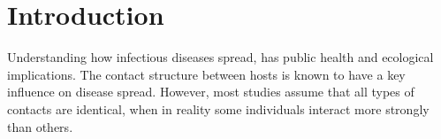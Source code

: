 \section{Introduction}
 \cite{10.1371/journal.pcbi.1003352}
Understanding how infectious diseases spread, has public health and ecological implications. The contact structure between hosts is known to have a key influence on disease spread. However, most studies assume that all types of contacts are identical, when in reality some individuals interact more strongly than others.